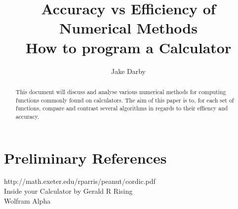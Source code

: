 \documentclass[12pt]{article}
\begin{document}
\author{Jake Darby}
\title{Accuracy vs Efficiency of Numerical Methods \\ \large How to program a Calculator}
\date{}
\maketitle

\begin{abstract}
\begin{center}
This document will discuss and analyse various numerical methods for computing functions commonly found on calculators. The aim of this paper is to, for each set of functions, compare and contrast several algorithms in regards to their effiency and accuracy.
\end{center}
\end{abstract}

\iffalse
\newpage
\tableofcontents
\newpage
\fi









\section{Preliminary References}
http://math.exeter.edu/rparris/peanut/cordic.pdf \\
Inside your Calculator by Gerald R Rising \\
Wolfram Alpha \\

\appendix

\end{document}

